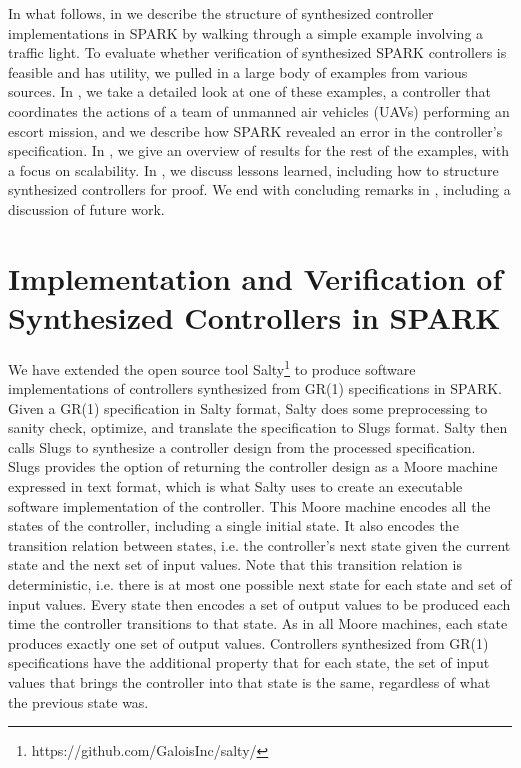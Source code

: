 \documentclass[runningheads]{llncs}
\begin{document}
In what follows, in  we describe the structure of synthesized controller implementations in SPARK 
by walking through a simple example involving a traffic light. 
To evaluate whether verification of synthesized SPARK controllers is feasible and has utility, 
we pulled in a large body of examples from various sources. 
In , we take a detailed look at one of these examples, a controller that coordinates the actions of 
a team of unmanned air vehicles (UAVs) performing an escort mission, 
and we describe how SPARK revealed an error in the controller's specification. 
In , we give an overview of results for the rest of the examples, with a focus on scalability. 
In , we discuss lessons learned, including how to structure synthesized controllers for proof.  
We end with concluding remarks in , including a discussion of future work.

\section{Implementation and Verification of Synthesized Controllers in SPARK}
\label{sec:implementation}

We have extended the open source tool Salty\footnote{https://github.com/GaloisInc/salty/} to produce software implementations of controllers synthesized from GR(1) specifications in SPARK. 
Given a GR(1) specification in Salty format, Salty does some preprocessing to sanity check, optimize, and translate the specification to Slugs format. 
Salty then calls Slugs to synthesize a controller design from the processed specification. 
Slugs provides the option of returning the controller design as a Moore machine expressed in text format, 
which is what Salty uses to create an executable software implementation of the controller. 
This Moore machine encodes all the states of the controller, including a single initial state. 
It also encodes the transition relation between states, i.e. the controller's next state given the current state 
and the next set of input values. 
Note that this transition relation is deterministic, i.e. there is at most one possible next state for each state and set of input values. 
Every state then encodes a set of output values to be produced each time the controller transitions to that state. 
As in all Moore machines, each state produces exactly one set of output values. 
Controllers synthesized from GR(1) specifications have the additional property that for each state, 
the set of input values that brings the controller into that state is the same, regardless of what the previous state was.
\end{document}
